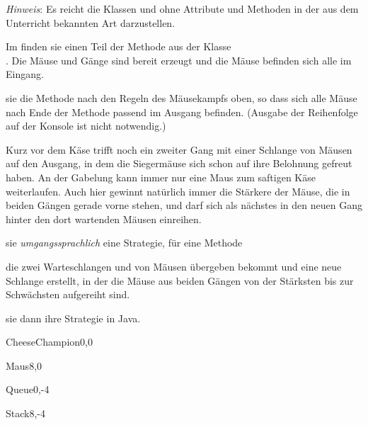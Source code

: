 \begin{aufgabe}[subtitle=(Mit) Datenstrukturen implementieren]
\begin{teilaufgaben}
		{\small\textit{Hinweis}: Es reicht die Klassen  und  ohne Attribute und Methoden in der aus dem Unterricht bekannten Art darzustellen.}
		
		\teilaufgabe
		Im  finden sie einen Teil der Methode  aus der Klasse \\ . Die Mäuse und Gänge sind bereit erzeugt und die Mäuse befinden sich alle im Eingang.
		
		 sie die Methode nach den Regeln des Mäusekampfs oben, so dass sich alle Mäuse nach Ende der Methode passend im Ausgang befinden. (Ausgabe der Reihenfolge auf der Konsole ist nicht notwendig.)
		
		\teilaufgabe
		Kurz vor dem Käse trifft noch ein zweiter Gang mit einer Schlange von Mäusen auf den Ausgang, in dem die Siegermäuse sich schon auf ihre Belohnung gefreut haben. An der Gabelung kann immer nur eine Maus zum saftigen Käse weiterlaufen. Auch hier gewinnt natürlich immer die Stärkere der Mäuse, die in beiden Gängen gerade vorne stehen, und darf sich als nächstes in den neuen Gang hinter den dort wartenden Mäusen einreihen.
		
		 sie \emph{umgangssprachlich} eine Strategie, für eine Methode
		\begin{center}
		\end{center}
		die zwei Warteschlangen  und  von Mäusen übergeben bekommt und eine neue Schlange erstellt, in der die Mäuse aus beiden Gängen von der Stärksten bis zur Schwächsten aufgereiht sind.
		
		 sie dann ihre Strategie in Java.
	\end{teilaufgaben}
	
	\begin{loesung}
		\begin{teilaufgaben}			
			\teilaufgabe \hspace*{1pt}
			\begin{center}
				\begin{klassendiagramm}
					\begin{klasse}[text width=5cm]{CheeseChampion}{0,0}
					\end{klasse}
					\begin{klasse}[text width=5cm]{Maus}{8,0}
					\end{klasse}
					\begin{klasse}[text width=3cm]{Queue}{0,-4}
					\end{klasse}
					\begin{klasse}[text width=3cm]{Stack}{8,-4}
					\end{klasse}
					

\end{klassendiagramm}
\end{center}
\end{teilaufgaben}
\end{loesung}
\end{aufgabe}
